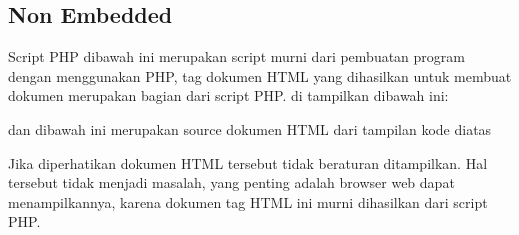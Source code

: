 \subsection{Non Embedded}
   \item Script PHP dibawah ini merupakan script murni dari pembuatan program dengan menggunakan PHP, tag dokumen HTML yang dihasilkan untuk membuat dokumen merupakan bagian dari script PHP. di tampilkan dibawah ini:
  
dan dibawah ini merupakan source dokumen HTML dari tampilan kode diatas  
  
Jika diperhatikan dokumen HTML tersebut tidak beraturan ditampilkan. Hal tersebut tidak menjadi masalah, yang penting adalah browser web dapat menampilkannya, karena dokumen tag HTML ini murni dihasilkan dari script PHP. 
